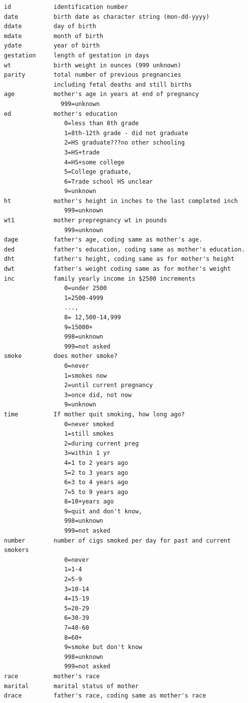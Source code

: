 \documentclass[
]{book}
\begin{document}
\begin{verbatim}
id            identification number
date          birth date as character string (mon-dd-yyyy)
ddate         day of birth
mdate         month of birth
ydate         year of birth
gestation     length of gestation in days
wt            birth weight in ounces (999 unknown)
parity        total number of previous pregnancies 
              including fetal deaths and still births
age           mother's age in years at end of pregnancy
                999=unknown
ed            mother's education 
                 0=less than 8th grade
                 1=8th-12th grade - did not graduate
                 2=HS graduate???no other schooling
                 3=HS+trade
                 4=HS+some college
                 5=College graduate,
                 6=Trade school HS unclear
                 9=unknown
ht            mother's height in inches to the last completed inch 
                 999=unknown
wt1           mother prepregnancy wt in pounds
                 999=unknown
dage          father's age, coding same as mother's age.
ded           father's education, coding same as mother's education.
dht           father's height, coding same as for mother's height
dwt           father's weight coding same as for mother's weight
inc           family yearly income in $2500 increments
                 0=under 2500
                 1=2500-4999
                 ..., 
                 8= 12,500-14,999
                 9=15000+
                 998=unknown
                 999=not asked
smoke         does mother smoke? 
                 0=never
                 1=smokes now
                 2=until current pregnancy
                 3=once did, not now
                 9=unknown
time          If mother quit smoking, how long ago? 
                 0=never smoked
                 1=still smokes
                 2=during current preg
                 3=within 1 yr
                 4=1 to 2 years ago
                 5=2 to 3 years ago
                 6=3 to 4 years ago
                 7=5 to 9 years ago 
                 8=10+years ago
                 9=quit and don't know,
                 998=unknown
                 999=not asked
number        number of cigs smoked per day for past and current smokers 
                 0=never
                 1=1-4
                 2=5-9
                 3=10-14
                 4=15-19
                 5=20-29
                 6=30-39
                 7=40-60
                 8=60+
                 9=smoke but don't know
                 998=unknown
                 999=not asked
race          mother's race 
marital       marital status of mother
drace         father's race, coding same as mother's race
\end{verbatim}
\end{document}
